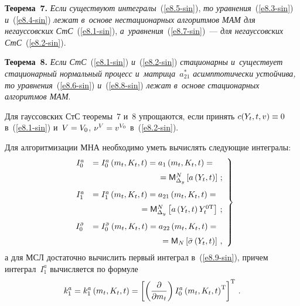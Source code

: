 \begin{multicols}{2}
\noindent
\textbf{Теорема~7.} \textit{Если существуют интегралы}~(\ref{e8.5-sin}), 
\textit{то уравнения}~(\ref{e8.3-sin}) \textit{и}~(\ref{e8.4-sin}) 
\textit{лежат в~основе нестационарных алгоритмов МАМ для негауссовских 
СтС}~(\ref{e8.1-sin}), \textit{а~уравнения}~(\ref{e8.7-sin})~---  
\textit{для негауссовских  СтС}~(\ref{e8.2-sin}).

\smallskip

\noindent
\textbf{Теорема~8.} \textit{Если СтС}~(\ref{e8.1-sin}) \textit{и}~(\ref{e8.2-sin}) 
\textit{стационарны и~существует стационарный нормальный процесс и~мат\-ри\-ца~$a_{21}^*$ 
асимптотически устойчива, то уравнения}~(\ref{e8.6-sin}) \textit{и}~(\ref{e8.8-sin}) 
\textit{лежат в~основе стационарных алгоритмов МАМ}.

\smallskip

Для гауссовских СтС теоремы~7 и~8 упрощаются, если принять  $c(Y_t, t, v)\hm\equiv 0$ 
в~(\ref{e8.1-sin}) и~$V\hm=V_0$, $\nu^V \hm= v^{V_0}$ в~(\ref{e8.2-sin}).

Для алгоритмизации МНА необходимо уметь вычислять следующие интегралы:
\begin{equation}
\left.
\begin{array}{rl}
I_0^a &= I_0^a \left(m_t, K_t, t\right) = 
    a_1 \left(m_t, K_t, t\right)={}\\[6pt]
    &\hspace*{28mm}{}={\sf M}_{\Delta_y}^N \lk a\left(Y_t, t\right)\rk\,;\\[9pt]
I_1^a &= I_1^a \left(m_t, K_t, t\right)= 
    a_{21}\left(m_t, K_t, t\right)= {}\\[6pt]
&    \hspace*{20mm}{}={\sf M}_{\Delta_y}^N \lk a\left(Y_t , t\right) 
    Y_t^{0\mathrm{T}}\rk\,;
    \\[9pt]
  I_0^{\bar \sigma} &= I_0^{\bar \sigma} \left(m_t, K_t, t\right) = a_{22}
  \left(m_t, K_t, t\right) ={}\\[6pt]
&  \hspace*{29mm}{}= {\sf M}_N \lk \bar \sigma\left(Y_t, t\right)\rk\,,
\end{array}
\right\}
  \label{e8.9-sin}
  \end{equation}
а для МСЛ достаточно вычислить первый интеграл в~(\ref{e8.9-sin}), 
причем интеграл~$I_1^a$ вычисляется по формуле~\cite{1-sin, 5-sin, 6-sin}
    \begin{equation*}
    k_1^a = k_1^a \left(m_t, K_t, t\right)=\left[ \left( \displaystyle\frac{\displaystyle \partial\mathstrut}{\displaystyle \partial m_t\mathstrut}\right) 
    I_0^a \left(m_t, K_t, t\right)^{\mathrm{T}}\right]^{\mathrm{T}}\,.
    \end{equation*}


\end{multicols}
